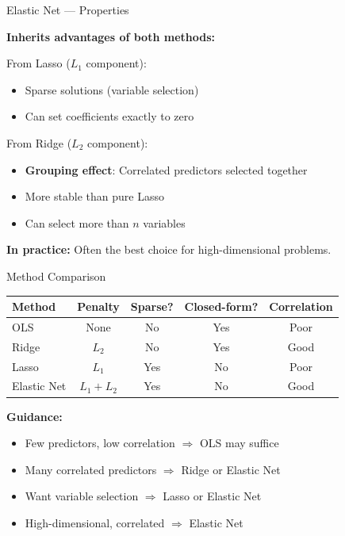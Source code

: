 \documentclass[10pt]{beamer}
\newcommand{\highlight}[1]{\textcolor{AccentOrange}{\textbf{#1}}}
\begin{document}

\begin{frame}{Elastic Net --- Properties}

\textbf{Inherits advantages of both methods:}

\vspace{1em}
From Lasso ($L_1$ component):
\begin{itemize}
  \item Sparse solutions (variable selection)
  \item Can set coefficients exactly to zero
\end{itemize}

\vspace{0.5em}
From Ridge ($L_2$ component):
\begin{itemize}
  \item \highlight{Grouping effect}: Correlated predictors selected together
  \item More stable than pure Lasso
  \item Can select more than $n$ variables
\end{itemize}

\vspace{1em}
\textbf{In practice:} Often the best choice for high-dimensional problems.

\end{frame}



\begin{frame}{Method Comparison}

\begin{center}
\begin{tabular}{lcccc}
\toprule
\textbf{Method} & \textbf{Penalty} & \textbf{Sparse?} & \textbf{Closed-form?} & \textbf{Correlation} \\
\midrule
OLS & None & No & Yes & Poor \\
Ridge & $L_2$ & No & Yes & Good \\
Lasso & $L_1$ & Yes & No & Poor \\
Elastic Net & $L_1 + L_2$ & Yes & No & Good \\
\bottomrule
\end{tabular}
\end{center}

\vspace{1em}
\textbf{Guidance:}
\begin{itemize}
  \item Few predictors, low correlation $\Rightarrow$ OLS may suffice
  \item Many correlated predictors $\Rightarrow$ Ridge or Elastic Net
  \item Want variable selection $\Rightarrow$ Lasso or Elastic Net
  \item High-dimensional, correlated $\Rightarrow$ Elastic Net
\end{itemize}

\end{frame}
\end{document}
